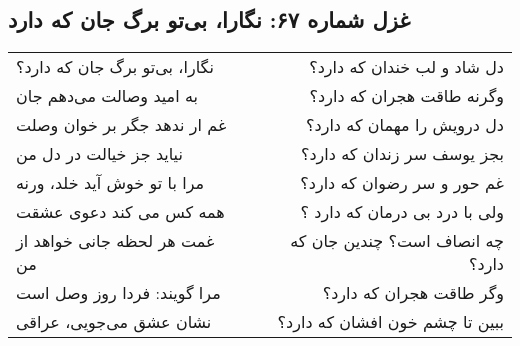 \begin{center}
\section*{غزل شماره ۶۷: نگارا، بی‌تو برگ جان که دارد}
\label{sec:067}
\begin{longtable}{l p{0.5cm} r}
نگارا، بی‌تو برگ جان که دارد؟
&&
دل شاد و لب خندان که دارد؟
\\
به امید وصالت می‌دهم جان
&&
وگرنه طاقت هجران که دارد؟
\\
غم ار ندهد جگر بر خوان وصلت
&&
دل درویش را مهمان که دارد؟
\\
نیاید جز خیالت در دل من
&&
بجز یوسف سر زندان که دارد؟
\\
مرا با تو خوش آید خلد، ورنه
&&
غم حور و سر رضوان که دارد؟
\\
همه کس می کند دعوی عشقت
&&
ولی با درد بی درمان که دارد ؟
\\
غمت هر لحظه جانی خواهد از من
&&
چه انصاف است؟ چندین جان که دارد؟
\\
مرا گویند: فردا روز وصل است
&&
وگر طاقت هجران که دارد؟
\\
نشان عشق می‌جویی، عراقی
&&
ببین تا چشم خون افشان که دارد؟
\\
\end{longtable}
\end{center}
